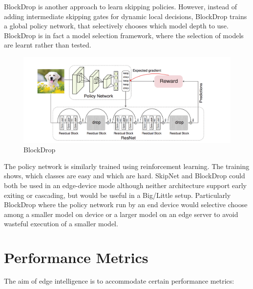BlockDrop \cite{wu_blockdrop:_2017} is another approach to learn skipping policies. However, instead of adding intermediate skipping gates for dynamic local decisions, BlockDrop trains a global policy network, that selectively chooses which model depth to use. BlockDrop is in fact a model selection framework, where the selection of models are learnt rather than tested. 

\begin{figure}
	\centering
	\includegraphics[width=\linewidth]{figures/models/blockdrop}
	\caption[BlockDrop]{BlockDrop}
\end{figure}

The policy network is similarly trained using reinforcement learning. The training shows, which classes are easy and which are hard. SkipNet and BlockDrop could both be used in an edge-device mode although neither architecture support early exiting or cascading, but would be useful in a Big/Little \cite{park_big/little_2015} setup. Particularly BlockDrop where the policy network run by an end device would selective choose among a smaller model on device or a larger model on an edge server to avoid wasteful execution of a smaller model.

\section{Performance Metrics}

The aim of edge intelligence is to accommodate certain performance metrics:

